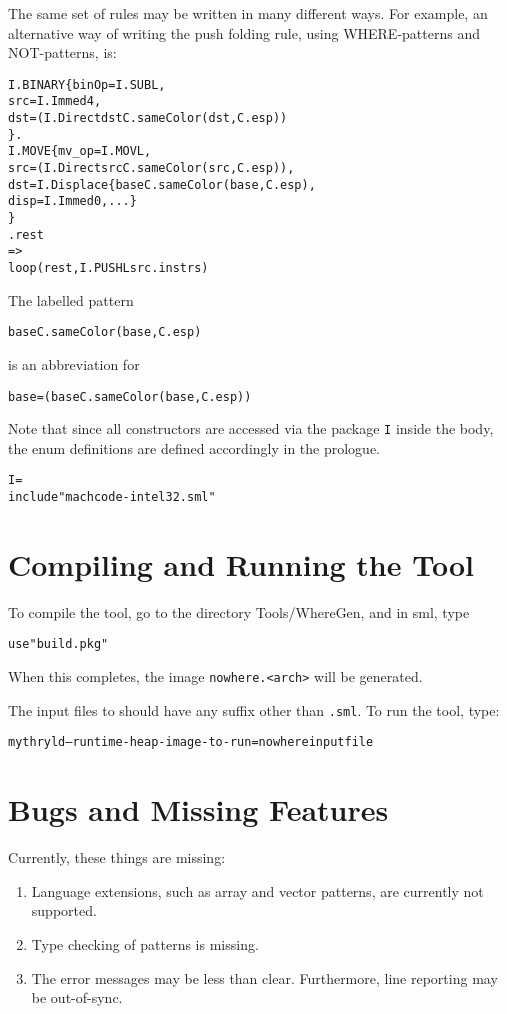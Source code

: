 The same set of rules may be written in many different ways.
For example, an alternative way of writing the push folding rule, using
WHERE-patterns and NOT-patterns, is:
\begin{alltt}
     I.BINARY\{binOp=I.SUBL, 
               src=I.Immed 4, 
               dst=(I.Direct dst \WHERE C.sameColor(dst,C.esp))
             \} . 
     I.MOVE\{mv_op=I.MOVL,
             src=\NOT (I.Direct src \WHERE C.sameColor(src,C.esp)),
             dst=I.Displace\{base \WHERE C.sameColor(base,C.esp),
                             disp=I.Immed 0, ...\}
           \}
     . rest 
        =>
         loop(rest, I.PUSHL src . instrs)
\end{alltt}
The labelled pattern 
\begin{alltt}
   base \WHERE C.sameColor(base,C.esp)
\end{alltt}
is an abbreviation for 
\begin{alltt}
   base=(base \WHERE C.sameColor(base,C.esp))
\end{alltt}

Note that since all constructors are accessed via the package \verb|I|
inside the body, 
the enum definitions are defined accordingly in the prologue.
\begin{alltt}
   \PACKAGE I = 
   \STRUCT
      include "machcode-intel32.sml" 
   \END
\end{alltt}

\section{Compiling and Running the Tool}

To compile the tool, go to the directory Tools/WhereGen, and in sml, type
\begin{alltt}
   use "build.pkg"
\end{alltt}
When this completes, the image \verb|nowhere.<arch>| will be generated.

The input files to \nowhere{} should have any suffix other than \verb|.sml|.
To run the tool, type:
\begin{alltt}
    mythryld --runtime-heap-image-to-run=nowhere inputfile
\end{alltt}

\section{Bugs and Missing Features}
   Currently, these things are missing:
\begin{enumerate}
  \item Language extensions, such as array and vector patterns, are currently not supported. 
  \item Type checking of patterns is missing.
  \item The error messages may be less than clear.  Furthermore, 
        line reporting may be out-of-sync.
\end{enumerate}


